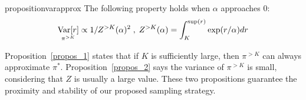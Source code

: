 \begin{restatable}{proposition}{varapprox}
\label{propos_2}
The following property holds when $\alpha$ approaches $0$:
    \begin{equation*}
        \underset{\pi^{>K}}{\mathrm{Var}[r]} \propto 1 / Z^{>K}(\alpha)^2 \; , \; Z^{>K}(\alpha) = \int^{\sup(r)}_K \exp(r/\alpha)dr
    \end{equation*}
\end{restatable}

Proposition~\ref{propos_1} states that if $K$ is sufficiently large, then $\pi^{>K}$ can always approximate $\pi^*$.
Proposition~\ref{propos_2} says the variance of $\pi^{>K}$ is small, considering that $Z$ is usually a large value.
These two propositions guarantee the proximity and stability of our proposed sampling strategy.




